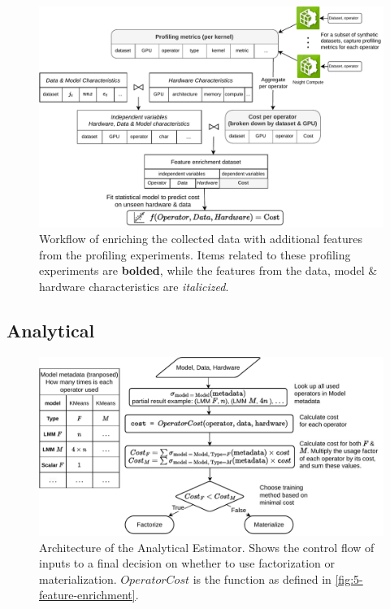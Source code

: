 \begin{figure}[ht]
    \centering
    \includegraphics[width=\linewidth]{chapters/05_cost_estimation/figures/feature-engineering.pdf}
    \caption[Feature enrichment workflow]{Workflow of enriching the collected data with additional features from the profiling experiments. Items related to these profiling experiments are \textbf{bolded}, while the features from the data, model \& hardware characteristics are \textit{italicized}.}
    \label{fig:5-feature-enrichment}
\end{figure}

\subsection{Analytical}
\begin{figure}[ht]
    \centering
    \includegraphics[width=\linewidth]{chapters/05_cost_estimation/figures/analytical-architecture.pdf}
    \caption[Analytical Estimator Architecture]{Architecture of the Analytical Estimator. Shows the control flow of inputs to a final decision on whether to use factorization or materialization. $OperatorCost$ is the function as defined in \autoref{fig:5-feature-enrichment}.}
    \label{fig:5-analytical-architecture}
\end{figure}

